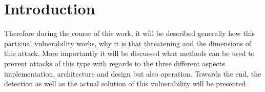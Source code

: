
\section{Introduction}

Therefore during the course of this work, it will be described generally how this particual vulnerability works, why it is that threatening and the dimensions of this attack. More importantly it will be discussed what methods can be used to prevent attacks of this type with regards to the three different aspects implementation, architecture and design but also operation. Towards the end, the detection as well as the actual solution of this vulnerability will be presented.